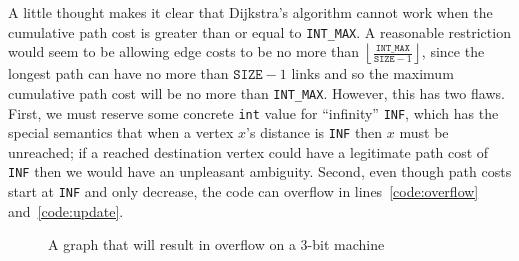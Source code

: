 A little thought makes it clear that Dijkstra's algorithm cannot work when the cumulative path
cost is greater than or equal to \texttt{INT\_MAX}.  A reasonable restriction would seem to be
allowing edge costs to be no more than $\left\lfloor\frac{\texttt{INT\_MAX}}{\texttt{SIZE}-1}\right\rfloor$, since the longest path can have no more than $\texttt{SIZE}-1$ links and so the maximum cumulative path cost will be no more than \texttt{INT\_MAX}.  However, this has two flaws.  First, we must reserve some concrete \texttt{int} value for ``infinity'' \texttt{INF}, which has the special semantics that when a vertex $x$'s distance is \texttt{INF} then $x$ must be unreached; if a reached destination vertex could have a legitimate path cost of \texttt{INF} then we would have an unpleasant ambiguity.  Second, even though path costs start at \texttt{INF} and only decrease, the code can overflow in lines~\ref{code:overflow} and~\ref{code:update}.

\begin{figure}[t]
\centering
{}
\caption{A graph that will result in overflow on a 3-bit machine}
\label{fig:overflow}
\end{figure}

